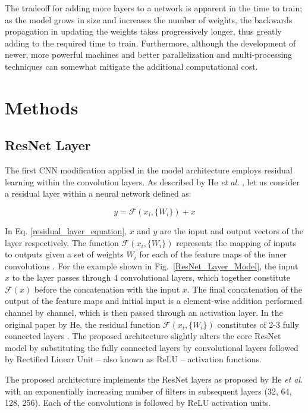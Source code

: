 \documentclass[conference]{IEEEtran}
\begin{document}
The tradeoff for adding more layers to a network is apparent in the time to train; as the model grows in size and increases the number of weights, the backwards propagation in updating the weights takes progressively longer, thus greatly adding to the required time to train. Furthermore, although the development of newer, more powerful machines and better parallelization and multi-processing techniques can somewhat mitigate the additional computational cost.

\section{Methods}
\subsection{ResNet Layer}
The first CNN modification applied in the model architecture employs residual learning within the convolution layers. As described by He \textit{et al.} \cite{He2016}, let us consider a residual layer within a neural network defined as:

\begin{equation}
y = \mathcal{F} \left(x_i,\{W_i\}\right) + x
\label{residual_layer_equation}
\end{equation}

In Eq. \ref{residual_layer_equation}, $x$ and $y$ are the input and output vectors of the layer respectively. The function $\mathcal{F} \left(x_i,\{W_i\}\right)$ represents the mapping of inputs to outputs given a set of weights $W_i$ for each of the feature maps of the inner convolutions \cite{He2016}. For the example shown in Fig.~\ref{ResNet_Layer_Model}, the input $x$ to the layer passes through 4 convolutional layers, which together constitute $\mathcal{F}(x)$ before the concatenation with the input $x$. The final concatenation of the output of the feature maps and initial input is a element-wise addition performed channel by channel, which is then passed through an activation layer. In the original paper by He, the residual function $\mathcal{F} \left(x_i,\{W_i\}\right)$ constitutes of 2-3 fully connected layers \cite{He2016}. The proposed architecture slightly alters the core ResNet model by substituting the fully connected layers by convolutional layers followed by Rectified Linear Unit -- also known as ReLU -- activation functions.

The proposed architecture implements the ResNet layers as proposed by He \emph{et al.} with an exponentially increasing number of filters in subsequent layers (32, 64, 128, 256). Each of the convolutions is followed by ReLU activation units.
\end{document}
